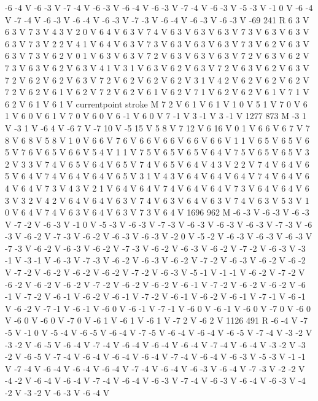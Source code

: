 {-6 -4 V
-6 -3 V
-7 -4 V
-6 -3 V
-6 -4 V
-6 -3 V
-7 -4 V
-6 -3 V
-5 -3 V
-1 0 V
-6 -4 V
-7 -4 V
-6 -3 V
-6 -4 V
-6 -3 V
-7 -3 V
-6 -4 V
-6 -3 V
-6 -3 V
-69 241 R
6 3 V
6 3 V
7 3 V
4 3 V
2 0 V
6 4 V
6 3 V
7 4 V
6 3 V
6 3 V
6 3 V
7 3 V
6 3 V
6 3 V
6 3 V
7 3 V
2 2 V
4 1 V
6 4 V
6 3 V
7 3 V
6 3 V
6 3 V
6 3 V
7 3 V
6 2 V
6 3 V
6 3 V
7 3 V
6 2 V
0 1 V
6 3 V
6 3 V
7 2 V
6 3 V
6 3 V
6 3 V
7 2 V
6 3 V
6 2 V
7 3 V
6 3 V
6 2 V
6 3 V
4 1 V
3 1 V
6 3 V
6 2 V
6 3 V
7 2 V
6 3 V
6 2 V
6 3 V
7 2 V
6 2 V
6 2 V
6 3 V
7 2 V
6 2 V
6 2 V
6 2 V
3 1 V
4 2 V
6 2 V
6 2 V
6 2 V
7 2 V
6 2 V
6 1 V
6 2 V
7 2 V
6 2 V
6 1 V
6 2 V
7 1 V
6 2 V
6 2 V
6 1 V
7 1 V
6 2 V
6 1 V
6 1 V
currentpoint stroke M
7 2 V
6 1 V
6 1 V
1 0 V
5 1 V
7 0 V
6 1 V
6 0 V
6 1 V
7 0 V
6 0 V
6 -1 V
6 0 V
7 -1 V
3 -1 V
3 -1 V
1277 873 M
-3 1 V
-3 1 V
-6 4 V
-6 7 V
-7 10 V
-5 15 V
5 8 V
7 12 V
6 16 V
0 1 V
6 6 V
6 7 V
7 8 V
6 8 V
5 8 V
1 0 V
6 6 V
7 6 V
6 6 V
6 6 V
6 6 V
6 6 V
1 1 V
6 5 V
6 5 V
6 5 V
7 6 V
6 5 V
6 6 V
5 4 V
1 1 V
7 5 V
6 5 V
6 5 V
6 4 V
7 5 V
6 5 V
6 5 V
3 2 V
3 3 V
7 4 V
6 5 V
6 4 V
6 5 V
7 4 V
6 5 V
6 4 V
4 3 V
2 2 V
7 4 V
6 4 V
6 5 V
6 4 V
7 4 V
6 4 V
6 4 V
6 5 V
3 1 V
4 3 V
6 4 V
6 4 V
6 4 V
7 4 V
6 4 V
6 4 V
6 4 V
7 3 V
4 3 V
2 1 V
6 4 V
6 4 V
7 4 V
6 4 V
6 4 V
7 3 V
6 4 V
6 4 V
6 3 V
3 2 V
4 2 V
6 4 V
6 4 V
6 3 V
7 4 V
6 3 V
6 4 V
6 3 V
7 4 V
6 3 V
5 3 V
1 0 V
6 4 V
7 4 V
6 3 V
6 4 V
6 3 V
7 3 V
6 4 V
1696 962 M
-6 -3 V
-6 -3 V
-6 -3 V
-7 -2 V
-6 -3 V
-1 0 V
-5 -3 V
-6 -3 V
-7 -3 V
-6 -3 V
-6 -3 V
-6 -3 V
-7 -3 V
-6 -3 V
-6 -2 V
-7 -3 V
-6 -2 V
-6 -3 V
-6 -3 V
-2 0 V
-5 -2 V
-6 -3 V
-6 -3 V
-6 -3 V
-7 -3 V
-6 -2 V
-6 -3 V
-6 -2 V
-7 -3 V
-6 -2 V
-6 -3 V
-6 -2 V
-7 -2 V
-6 -3 V
-3 -1 V
-3 -1 V
-6 -3 V
-7 -3 V
-6 -2 V
-6 -3 V
-6 -2 V
-7 -2 V
-6 -3 V
-6 -2 V
-6 -2 V
-7 -2 V
-6 -2 V
-6 -2 V
-6 -2 V
-7 -2 V
-6 -3 V
-5 -1 V
-1 -1 V
-6 -2 V
-7 -2 V
-6 -2 V
-6 -2 V
-6 -2 V
-7 -2 V
-6 -2 V
-6 -2 V
-6 -1 V
-7 -2 V
-6 -2 V
-6 -2 V
-6 -1 V
-7 -2 V
-6 -1 V
-6 -2 V
-6 -1 V
-7 -2 V
-6 -1 V
-6 -2 V
-6 -1 V
-7 -1 V
-6 -1 V
-6 -2 V
-7 -1 V
-6 -1 V
-6 0 V
-6 -1 V
-7 -1 V
-6 0 V
-6 -1 V
-6 0 V
-7 0 V
-6 0 V
-6 0 V
-6 0 V
-7 0 V
-6 1 V
-6 1 V
-6 1 V
-7 2 V
-6 2 V
1126 491 R
-6 -4 V
-7 -5 V
-1 0 V
-5 -4 V
-6 -5 V
-6 -4 V
-7 -5 V
-6 -4 V
-6 -4 V
-6 -5 V
-7 -4 V
-3 -2 V
-3 -2 V
-6 -5 V
-6 -4 V
-7 -4 V
-6 -4 V
-6 -4 V
-6 -4 V
-7 -4 V
-6 -4 V
-3 -2 V
-3 -2 V
-6 -5 V
-7 -4 V
-6 -4 V
-6 -4 V
-6 -4 V
-7 -4 V
-6 -4 V
-6 -3 V
-5 -3 V
-1 -1 V
-7 -4 V
-6 -4 V
-6 -4 V
-6 -4 V
-7 -4 V
-6 -4 V
-6 -3 V
-6 -4 V
-7 -3 V
-2 -2 V
-4 -2 V
-6 -4 V
-6 -4 V
-7 -4 V
-6 -4 V
-6 -3 V
-7 -4 V
-6 -3 V
-6 -4 V
-6 -3 V
-4 -2 V
-3 -2 V
-6 -3 V
-6 -4 V
}
